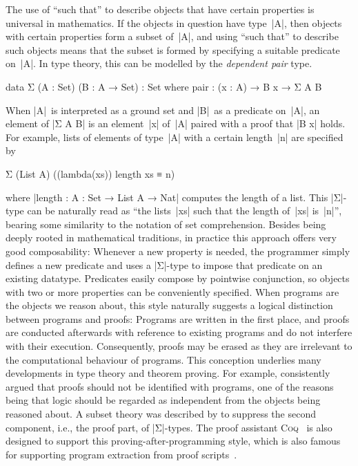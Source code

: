 The use of ``such that'' to describe objects that have certain properties is universal in mathematics.
If the objects in question have type~|A|, then objects with certain properties form a subset of~|A|, and using ``such that'' to describe such objects means that the subset is formed by specifying a suitable predicate on~|A|.
In type theory, this can be modelled by the \emph{dependent pair} type.
\begin{code}
data Σ (A : Set) (B : A → Set) : Set where
  pair : (x : A) → B x → Σ A B
\end{code}
When |A|~is interpreted as a ground set and |B|~as a predicate on~|A|, an element of |Σ A B| is an element~|x| of~|A| paired with a proof that |B x| holds.
For example, lists of elements of type~|A| with a certain length~|n| are specified by
\begin{code}
Σ (List A) ((lambda(xs)) length xs ≡ n)
\end{code}
where |length : {A : Set} → List A → Nat| computes the length of a list.
This |Σ|-type can be naturally read as ``the lists~|xs| such that the length of~|xs| is~|n|'', bearing some similarity to the notation of set comprehension.
Besides being deeply rooted in mathematical traditions, in practice this approach offers very good composability: Whenever a new property is needed, the programmer simply defines a new predicate and uses a |Σ|-type to impose that predicate on an existing datatype.
Predicates easily compose by pointwise conjunction, so objects with two or more properties can be conveniently specified.
When programs are the objects we reason about, this style naturally suggests a logical distinction between programs and proofs: Programs are written in the first place, and proofs are conducted afterwards with reference to existing programs and do not interfere with their execution.
Consequently, proofs may be erased as they are irrelevant to the computational behaviour of programs.
This conception underlies many developments in type theory and theorem proving.
For example, \citet{Luo-type-theory} consistently argued that proofs should not be identified with programs, one of the reasons being that logic should be regarded as independent from the objects being reasoned about.
A subset theory was described by \citet{Nordstroem-programming} to suppress the second component, i.e., the proof part, of |Σ|-types.
The proof assistant \textsc{Coq}~\citep{Bertot-Coq} is also designed to support this proving-after-programming style, which is also famous for supporting program extraction from proof scripts~\citep{Paulin-Mohring-extraction}.

